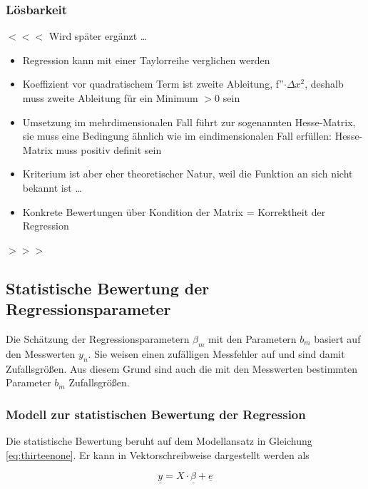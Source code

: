 \subsubsection{L\"{o}sbarkeit }

\noindent $<<<$ Wird sp\"{a}ter erg\"{a}nzt {\dots}

\begin{itemize}
    \item Regression kann mit einer Taylorreihe verglichen werden
    \item Koeffizient vor quadratischem Term ist zweite Ableitung, f''$\cdot\Delta x^{2}$, deshalb muss zweite Ableitung f\"{u}r ein Minimum $ > 0$ sein
    \item Umsetzung im mehrdimensionalen Fall f\"{u}hrt zur sogenannten Hesse-Matrix, sie muss eine Bedingung \"{a}hnlich wie im eindimensionalen Fall erf\"{u}llen: Hesse-Matrix muss positiv definit sein
    \item Kriterium ist aber eher theoretischer Natur, weil die Funktion an sich nicht bekannt ist {\dots}
    \item  Konkrete Bewertungen \"{u}ber Kondition der Matrix = Korrektheit der Regression
\end{itemize}

\noindent $>>>$

\clearpage

\subsection{Statistische Bewertung der Regressionsparameter}

\noindent Die Sch\"{a}tzung der Regressionsparametern $\beta_{m}$ mit den Parametern $b_{m}$ basiert auf den Messwerten $y_{n}$. Sie weisen einen zuf\"{a}lligen Messfehler auf und sind damit Zufallsgr\"{o}{\ss}en. Aus diesem Grund sind auch die mit den Messwerten bestimmten Parameter $b_{m}$ Zufallsgr\"{o}{\ss}en. 

\subsubsection{Modell zur statistischen Bewertung der Regression}

\noindent Die statistische Bewertung beruht auf dem Modellansatz in Gleichung \eqref{eq:thirteenone}. Er kann in Vektorschreibweise dargestellt werden als 

\begin{equation}\label{eq:thirteenthirtythree}
\underline{y}=X\cdot \underline{\beta }+\underline{e}
\end{equation}

